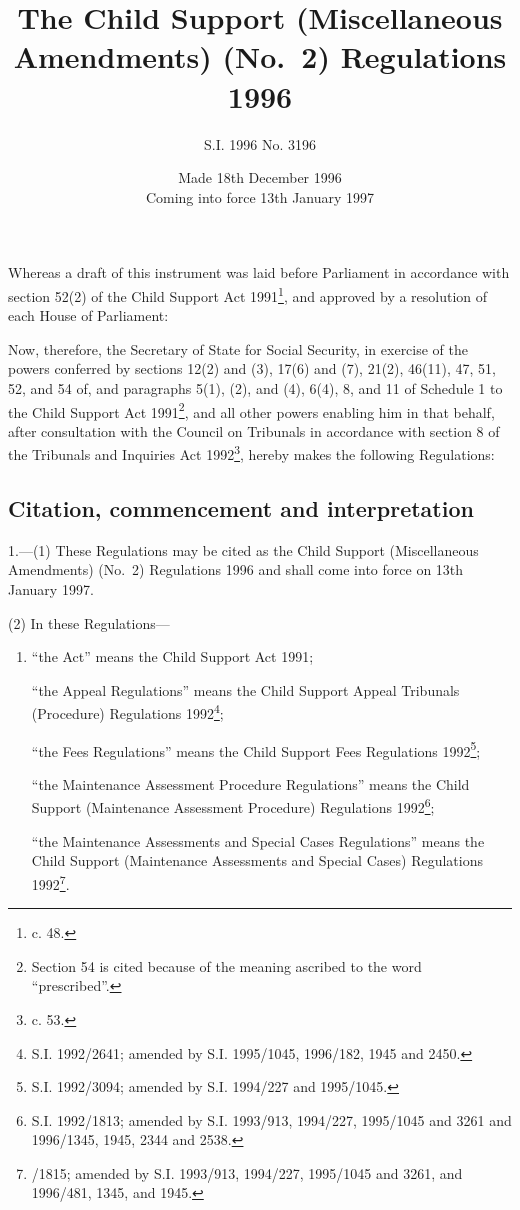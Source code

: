 \documentclass[a4paper]{article}
\title{The Child Support (Miscellaneous Amendments) (No.\ 2) Regulations 1996}
\author{S.I. 1996 No. 3196}
\date{Made 18th December 1996\\Coming into force 13th January 1997
}
\begin{document}
\maketitle

\noindent
Whereas a draft of this instrument was laid before Parliament in accordance with section 52(2) of the Child Support Act 1991\footnote{ c. 48.}, and approved by a resolution of each House of Parliament:

 Now, therefore, the Secretary of State for Social Security, in exercise of the powers conferred by sections 12(2) and (3), 17(6) and (7), 21(2), 46(11), 47, 51, 52, and 54 of, and paragraphs 5(1), (2), and (4), 6(4), 8, and 11 of Schedule 1 to the Child Support Act 1991\footnote{\frenchspacing Section 54 is cited because of the meaning ascribed to the word “prescribed”.}, and all other powers enabling him in that behalf, after consultation with the Council on Tribunals in accordance with section 8 of the Tribunals and Inquiries Act 1992\footnote{ c. 53.}, hereby makes the following Regulations:



{\sloppy

\tableofcontents

}

\setcounter{secnumdepth}{-2}

\subsection[1. Citation, commencement and interpretation]{Citation, commencement and interpretation}

1.—(1) These Regulations may be cited as the Child Support (Miscellaneous Amendments) (No.\ 2) Regulations 1996 and shall come into force on 13th January 1997.

(2) In these Regulations—
\begin{enumerate}\item[]
“the Act” means the Child Support Act 1991;

“the Appeal Regulations” means the Child Support Appeal Tribunals (Procedure) Regulations 1992\footnote{\frenchspacing S.I. 1992/2641; amended by S.I. 1995/1045, 1996/182, 1945 and 2450.};

“the Fees Regulations” means the Child Support Fees Regulations 1992\footnote{\frenchspacing S.I. 1992/3094; amended by S.I. 1994/227 and 1995/1045.};

“the Maintenance Assessment Procedure Regulations” means the Child Support (Maintenance Assessment Procedure) Regulations 1992\footnote{\frenchspacing S.I. 1992/1813; amended by S.I. 1993/913, 1994/227, 1995/1045 and 3261 and 1996/1345, 1945, 2344 and 2538.};

“the Maintenance Assessments and Special Cases Regulations” means the Child Support (Maintenance Assessments and Special Cases) Regulations 1992\footnote{/1815; amended by S.I. 1993/913, 1994/227, 1995/1045 and 3261, and 1996/481, 1345, and 1945.}.
\end{enumerate}
\end{document}
